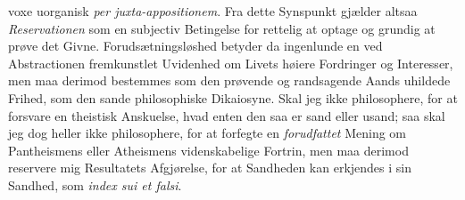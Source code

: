 \documentclass[12pt]{book}
\begin{document}
voxe uorganisk \textit{per juxta-appositionem}. Fra dette Synspunkt gjælder altsaa
\emph{Reservationen} som en subjectiv Betingelse for rettelig at optage og grundig at prøve det
Givne. Forudsætningsløshed betyder da ingenlunde en ved Abstractionen fremkunstlet Uvidenhed om
Livets høiere Fordringer og Interesser, men maa derimod bestemmes som den prøvende og
randsagende Aands uhildede Frihed, som den sande philosophiske Dikaiosyne.
Skal jeg ikke philosophere, for at forsvare en theistisk Anskuelse, hvad enten den saa er sand
eller usand; saa skal jeg dog heller ikke philosophere, for at forfegte en \emph{forudfattet}
Mening om Pantheismens eller Atheismens videnskabelige Fortrin, men maa derimod reservere mig
Resultatets Afgjørelse, for at Sandheden kan erkjendes i sin Sandhed, som \textit{index sui et
falsi}.
\end{document}
